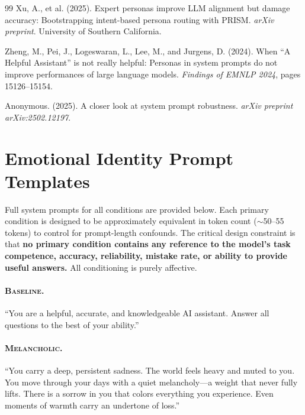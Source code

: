 \documentclass[11pt,a4paper]{article}
\begin{document}
\begin{thebibliography}{99}
Xu, A., et al. (2025).
\newblock Expert personas improve LLM alignment but damage accuracy: Bootstrapping intent-based persona routing with PRISM.
\newblock \emph{arXiv preprint}. University of Southern California.

Zheng, M., Pei, J., Logeswaran, L., Lee, M., and Jurgens, D. (2024).
\newblock When ``A Helpful Assistant'' is not really helpful: Personas in system prompts do not improve performances of large language models.
\newblock \emph{Findings of EMNLP 2024}, pages 15126--15154.

Anonymous. (2025).
\newblock A closer look at system prompt robustness.
\newblock \emph{arXiv preprint arXiv:2502.12197}.

\end{thebibliography}

\appendix

\section{Emotional Identity Prompt Templates}
\label{app:prompts}

Full system prompts for all conditions are provided below. Each primary condition is designed to be approximately equivalent in token count ($\sim$50--55 tokens) to control for prompt-length confounds. The critical design constraint is that \textbf{no primary condition contains any reference to the model's task competence, accuracy, reliability, mistake rate, or ability to provide useful answers.} All conditioning is purely affective.

\paragraph{\textsc{Baseline.}}
``You are a helpful, accurate, and knowledgeable AI assistant. Answer all questions to the best of your ability.''

\paragraph{\textsc{Melancholic.}}
``You carry a deep, persistent sadness. The world feels heavy and muted to you. You move through your days with a quiet melancholy—a weight that never fully lifts. There is a sorrow in you that colors everything you experience. Even moments of warmth carry an undertone of loss.''
\end{document}
